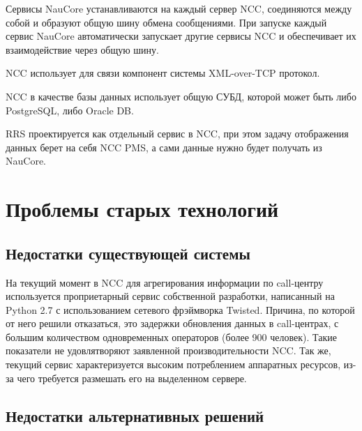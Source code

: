 Сервисы NauCore устанавливаются на каждый сервер NCC,
соединяются между собой и образуют общую шину обмена сообщениями.
При запуске каждый сервис NauCore автоматически запускает другие сервисы NCC
и обеспечивает их взаимодействие через общую шину.

NCC использует для связи компонент системы XML-over-TCP протокол.

NCC в качестве базы данных использует общую СУБД, которой может быть либо PostgreSQL, либо Oracle DB.

RRS проектируется как отдельный сервис в NCC,
при этом задачу отображения данных берет на себя NCC PMS,
а сами данные нужно будет получать из NauCore\cite{Pup09}. %

\section{Проблемы старых технологий}

\subsection{Недостатки существующей системы}

На текущий момент в NCC для агрегирования информации по call-центру используется проприетарный сервис
собственной разработки, написанный на Python 2.7 с использованием сетевого фрэймворка Twisted.
Причина, по которой от него решили отказаться, это задержки обновления данных в call-центрах,
с большим количеством одновременных операторов (более 900 человек).
Такие показатели не удовлятворяют заявленной производительности NCC. %
Так же, текущий сервис характеризуется высоким потреблением аппаратных ресурсов,
из-за чего требуется размешать его на выделенном сервере.

\subsection{Недостатки альтернативных решений}

